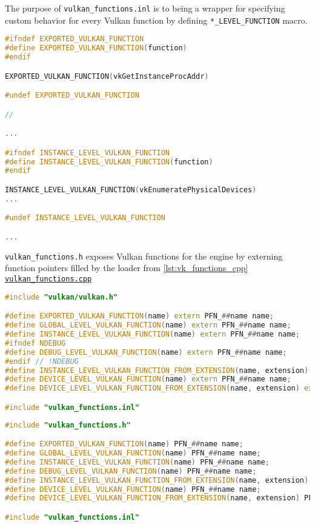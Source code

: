 The purpose of \texttt{vulkan\_functions.inl} is to being a wrapper for specifying custom behavior for every Vulkan function by defining \texttt{*\_LEVEL\_FUNCTION} macro.
\label{lst:vk_functions_inl}
\begin{lstlisting}[language=c++, caption=Instance level Vulkan functions (./engine/src/vulkan\_tools/vulkan\_functions.inl]
#ifndef EXPORTED_VULKAN_FUNCTION
#define EXPORTED_VULKAN_FUNCTION(function)
#endif

EXPORTED_VULKAN_FUNCTION(vkGetInstanceProcAddr)

#undef EXPORTED_VULKAN_FUNCTION

//

...

#ifndef INSTANCE_LEVEL_VULKAN_FUNCTION
#define INSTANCE_LEVEL_VULKAN_FUNCTION(function)
#endif

INSTANCE_LEVEL_VULKAN_FUNCTION(vkEnumeratePhysicalDevices)
...

#undef INSTANCE_LEVEL_VULKAN_FUNCTION

...
\end{lstlisting}

\texttt{vulkan\_functions.h} exposes Vulkan functions for the engine by externing function pointers filled by the loader from \hyperref[lst:vk_functions_cpp]{\ref*{lst:vk_functions_cpp} \texttt{vulkan\_functions.cpp}}
\begin{lstlisting}[language=c++, caption=All level Vuklan functions (./engine/src/vulkan\_tools/vulkan\_functions.h]
#include "vulkan/vulkan.h"

#define EXPORTED_VULKAN_FUNCTION(name) extern PFN_##name name;
#define GLOBAL_LEVEL_VULKAN_FUNCTION(name) extern PFN_##name name;
#define INSTANCE_LEVEL_VULKAN_FUNCTION(name) extern PFN_##name name;
#ifndef NDEBUG
#define DEBUG_LEVEL_VULKAN_FUNCTION(name) extern PFN_##name name;
#endif // !NDEBUG
#define INSTANCE_LEVEL_VULKAN_FUNCTION_FROM_EXTENSION(name, extension) extern PFN_##name name;
#define DEVICE_LEVEL_VULKAN_FUNCTION(name) extern PFN_##name name;
#define DEVICE_LEVEL_VULKAN_FUNCTION_FROM_EXTENSION(name, extension) extern PFN_##name name;

#include "vulkan_functions.inl"
\end{lstlisting}

\label{lst:vk_functions_cpp}
\begin{lstlisting}[language=c++, caption=Defining all level Vulkan functions (./engine/src/vulkan\_tools/vulkan\_functions.cpp)]
#include "vulkan_functions.h"

#define EXPORTED_VULKAN_FUNCTION(name) PFN_##name name;
#define GLOBAL_LEVEL_VULKAN_FUNCTION(name) PFN_##name name;
#define INSTANCE_LEVEL_VULKAN_FUNCTION(name) PFN_##name name;
#define DEBUG_LEVEL_VULKAN_FUNCTION(name) PFN_##name name;
#define INSTANCE_LEVEL_VULKAN_FUNCTION_FROM_EXTENSION(name, extension) PFN_##name name;
#define DEVICE_LEVEL_VULKAN_FUNCTION(name) PFN_##name name;
#define DEVICE_LEVEL_VULKAN_FUNCTION_FROM_EXTENSION(name, extension) PFN_##name name;

#include "vulkan_functions.inl"
\end{lstlisting}